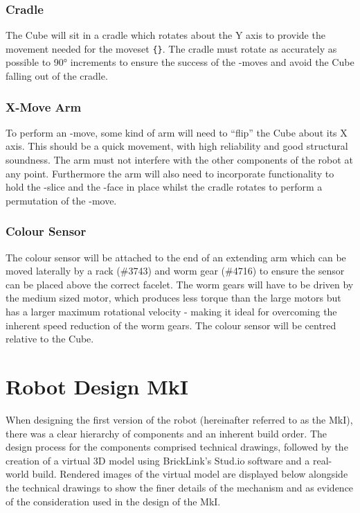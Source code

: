 \documentclass{report}
\newcommand{\legopiece}[1]{(\##1)}
\newcommand{\moveset}[1]{\uppercase{\texttt{\{\formatmoves{#1}\}}}}
\newcommand{\face}[1]{\uppercase{\texttt{\formatmovesnospace{#1}}}-face}
\newcommand{\move}[1]{\uppercase{\texttt{\formatmovesnospace{#1}}}-move}
\newcommand{\slice}[1]{\uppercase{\texttt{\formatmovesnospace{#1}}}-slice}
\begin{document}
    \subsubsection{Cradle}
    
    The Cube will sit in a cradle which rotates about the Y axis to provide the movement needed for the moveset \moveset{Y.Y'y2D.D'd"}. The cradle must rotate as accurately as possible to \ang{90} increments to ensure the success of the \move{x}s and avoid the Cube falling out of the cradle. 
    
    \subsubsection{X-Move Arm}
    To perform an \move{x}, some kind of arm will need to \enquote{flip} the Cube about its X axis. This should be a quick movement, with high reliability and good structural soundness. The arm must not interfere with the other components of the robot at any point. Furthermore the arm will also need to incorporate functionality to hold the \slice{l-r} and the \face{u} in place whilst the cradle rotates to perform a permutation of the \move{d}.
    
    \subsubsection{Colour Sensor}
    The colour sensor will be attached to the end of an extending arm which can be moved laterally by a rack \legopiece{3743} and worm gear \legopiece{4716} to ensure the sensor can be placed above the correct facelet. The worm gears will have to be driven by the medium sized motor, which produces less torque than the large motors but has a larger maximum rotational velocity - making it ideal for overcoming the inherent speed reduction of the worm gears. The colour sensor will be centred relative to the Cube.
    
    \section{Robot Design MkI}
    
	When designing the first version of the robot (hereinafter referred to as the MkI), there was a clear hierarchy of components and an inherent build order. The design process for the components comprised technical drawings, followed by the creation of a virtual 3D model using BrickLink's Stud.io software \cite{BrickLink2016} and a real-world build. Rendered images of the virtual model are displayed below alongside the technical drawings to show the finer details of the mechanism and as evidence of the consideration used in the design of the MkI.
    
\end{document}

